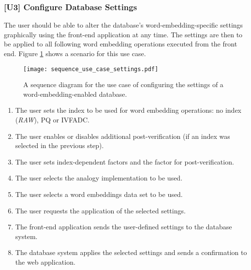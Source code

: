 \subsubsection{[U3] Configure Database Settings}
The user should be able to alter the database's word-embedding-specific settings graphically using the front-end application at any time. The settings are then to be applied to all following word embedding operations executed from the front end. Figure \ref{fig:use_case_settings} shows a scenario for this use case.
\begin{figure}
	\centering\texttt{[image: sequence\_use\_case\_settings.pdf]}
	\caption{A sequence diagram for the use case of configuring the settings of a word-embedding-enabled database.}
	\label{fig:use_case_settings}
\end{figure}
\begin{enumerate}
	\item The user sets the index to be used for word embedding operations: no index (\textit{RAW}), PQ or IVFADC.
	\item The user enables or disables additional post-verification (if an index was selected in the previous step).
	\item The user sets index-dependent factors and the factor for post-verification.
	\item The user selects the analogy implementation to be used.
	\item The user selects a word embeddings data set to be used.
	\item The user requests the application of the selected settings.
	\item The front-end application sends the user-defined settings to the database system.
	\item The database system applies the selected settings and sends a confirmation to the web application.
\end{enumerate}

